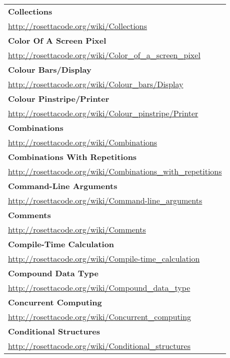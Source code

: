 \begin{longtable}{l}
\textbf{
Collections } \\ \href{http://rosettacode.org/wiki/Collections}{http://rosettacode.org/wiki/Collections} \\
\textbf{Color Of A Screen Pixel } \\ \href{http://rosettacode.org/wiki/Color\_of\_a\_screen\_pixel}{http://rosettacode.org/wiki/Color\_of\_a\_screen\_pixel} \\
\textbf{Colour Bars/Display } \\ \href{http://rosettacode.org/wiki/Colour\_bars/Display}{http://rosettacode.org/wiki/Colour\_bars/Display} \\
\textbf{
Colour Pinstripe/Printer } \\ \href{http://rosettacode.org/wiki/Colour\_pinstripe/Printer}{http://rosettacode.org/wiki/Colour\_pinstripe/Printer} \\
\textbf{Combinations } \\ \href{http://rosettacode.org/wiki/Combinations}{http://rosettacode.org/wiki/Combinations} \\
\textbf{
Combinations With Repetitions } \\ \href{http://rosettacode.org/wiki/Combinations\_with\_repetitions}{http://rosettacode.org/wiki/Combinations\_with\_repetitions} \\
\textbf{Command-Line Arguments } \\ \href{http://rosettacode.org/wiki/Command-line\_arguments}{http://rosettacode.org/wiki/Command-line\_arguments} \\
\textbf{Comments } \\ \href{http://rosettacode.org/wiki/Comments}{http://rosettacode.org/wiki/Comments} \\
\textbf{
Compile-Time Calculation } \\ \href{http://rosettacode.org/wiki/Compile-time\_calculation}{http://rosettacode.org/wiki/Compile-time\_calculation} \\
\textbf{Compound Data Type } \\ \href{http://rosettacode.org/wiki/Compound\_data\_type}{http://rosettacode.org/wiki/Compound\_data\_type} \\
\textbf{Concurrent Computing } \\ \href{http://rosettacode.org/wiki/Concurrent\_computing}{http://rosettacode.org/wiki/Concurrent\_computing} \\
\textbf{
Conditional Structures } \\ \href{http://rosettacode.org/wiki/Conditional\_structures}{http://rosettacode.org/wiki/Conditional\_structures} \\

\end{longtable}
